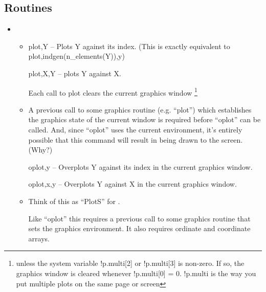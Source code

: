   \subsection{Routines}
  \begin{itemize}
    \item {}
   
        \begin{itemize} 
          \item

            plot,Y -- Plots Y against its index. (This is exactly
		equivalent to plot,indgen(n\_elements(Y)),y)

            plot,X,Y -- plots Y against X.
            
            Each call to plot clears the current graphics window
            \footnote{unless the system variable !p.multi[2] or !p.multi[3]  is
            non-zero. If so, the graphics window is cleared whenever
            !p.multi[0] = 0. !p.multi is the way you put multiple
             plots on the same page or screen}

          \item {}

            A previous call to some graphics routine (e.g. ``plot'')
            which establishes the graphics state of the current window
            is required before ``oplot'' can be called. And, since
            ``oplot'' uses the current environment, it's entirely
            possible that this command will result in 
            being drawn to the screen. (Why?)

              oplot,y -- Overplots Y against its index in the
              current graphics window. 

              oplot,x,y -- Overplots Y against X in the current graphics window. 

          \item {}

            Think of this as ``PlotS'' for .
   
            Like ``oplot'' this requires a previous call to some
            graphics routine that sets the graphics environment. It
            also requires  ordinate and coordinate arrays.


\end{itemize}
\end{itemize}

